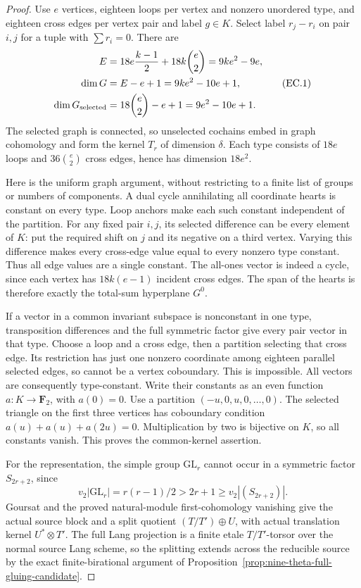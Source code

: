 \begin{proof}
Use $e$ vertices, eighteen loops per vertex and nonzero unordered
type, and eighteen cross edges per vertex pair and label $g\in K$.
Select label $r_j-r_i$ on pair $i,j$ for a tuple with $\sum r_i=0$.
There are
\[
 \begin{aligned}
 E&=18e\frac{k-1}{2}+18k\binom e2=9ke^2-9e,\\
 \dim G&=E-e+1=9ke^2-10e+1,\\
 \dim G_{\rm selected}&=18\binom e2-e+1=9e^2-10e+1.
 \end{aligned}                                                    \tag{EC.1}
\]
The selected graph is connected, so unselected cochains embed
in graph cohomology and form the kernel $T_r$ of dimension
$\delta$. Each type consists of $18e$ loops and
$36\binom e2$ cross edges, hence has dimension $18e^2$.

Here is the uniform graph argument, without restricting to a finite
list of groups or numbers of components. A dual cycle annihilating
all coordinate hearts is constant on every type. Loop anchors make
each such constant independent of the partition. For any fixed
pair $i,j$, its selected difference can be every element of $K$:
put the required shift on $j$ and its negative on a third vertex.
Varying this difference makes every cross-edge value equal to
every nonzero type constant. Thus all edge values are a single
constant. The all-ones vector is indeed a cycle, since each vertex
has $18k(e-1)$ incident cross edges. The span of the hearts is
therefore exactly the total-sum hyperplane $G^0$.

If a vector in a common invariant subspace is nonconstant in one
type, transposition differences and the full symmetric factor
give every pair vector in that type. Choose a loop and a cross
edge, then a partition selecting that cross edge. Its restriction
has just one nonzero coordinate among eighteen parallel selected
edges, so cannot be a vertex coboundary. This is impossible.
All vectors are consequently type-constant. Write their constants
as an even function $a:K\to\mathbf F_2$, with $a(0)=0$.
Use a partition $(-u,0,u,0,\ldots,0)$. The selected triangle on
the first three vertices has coboundary condition
$a(u)+a(u)+a(2u)=0$. Multiplication by two is bijective on $K$,
so all constants vanish. This proves the common-kernel assertion.

For the representation, the simple group $\mathrm{GL}_r$ cannot
occur in a symmetric factor $S_{2r+2}$, since
\[
 v_2|\mathrm{GL}_r|=r(r-1)/2>2r+1
                         \ge v_2|(S_{2r+2})|.
\]
Goursat and the proved natural-module first-cohomology vanishing
give the actual source block and a split quotient
$(T/T')\oplus U$, with actual translation kernel $U^*\otimes T'$.
The full Lang projection is a finite etale $T/T'$-torsor over the
normal source Lang scheme, so the splitting extends across the
reducible source by the exact finite-birational argument of
Proposition~\ref{prop:nine-theta-full-gluing-candidate}.


\end{proof}
